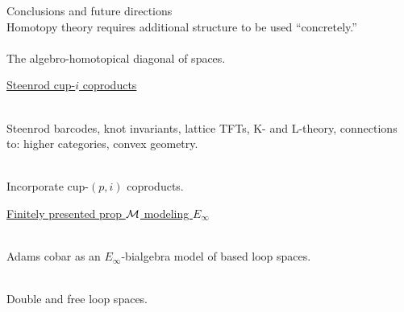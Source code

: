 
\begin{frame}{Conclusions and future directions}
	\pause
	 \\
	Homotopy theory requires additional structure to be used ``concretely.'' \\

	\medskip\pause
	 \\
	The algebro-homotopical diagonal of spaces.

	\medskip\pause
	\underline{Steenrod cup-$i$ coproducts}

	\medskip\pause
	 \\
	Steenrod barcodes, knot invariants, lattice TFTs, K- and L-theory, connections to: higher categories, convex geometry.

	\smallskip\pause
	 \\
	Incorporate cup-$(p,i)$ coproducts.

	\medskip\pause
	\underline{Finitely presented prop $\mathcal{M}$ modeling $E_\infty$}

	\medskip\pause
	 \\
	Adams cobar as an $E_\infty$-bialgebra model of based loop spaces.

	\smallskip\pause
	 \\
	Double and free loop spaces.
\end{frame}